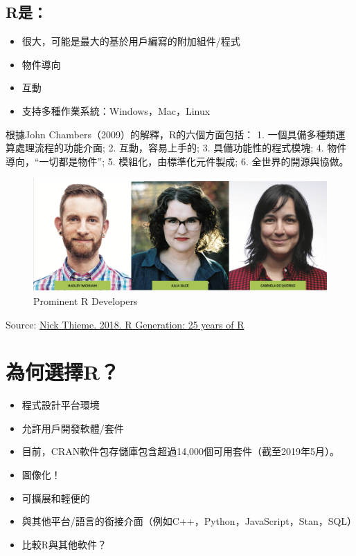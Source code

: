 \documentclass[]{book}
\providecommand{\tightlist}{%
  \setlength{\itemsep}{0pt}\setlength{\parskip}{0pt}}
\begin{document}
\hypertarget{r-2}{%
\subsection{R是：}\label{r-2}}

\begin{itemize}
\tightlist
\item
  很大，可能是最大的基於用戶編寫的附加組件/程式
\item
  物件導向
\item
  互動
\item
  支持多種作業系統：Windows，Mac，Linux
\end{itemize}

根據John Chambers（2009）的解釋，R的六個方面包括：
1. 一個具備多種類運算處理流程的功能介面;
2. 互動，容易上手的;
3. 具備功能性的程式模塊;
4. 物件導向，``一切都是物件'';
5. 模組化，由標準化元件製成;
6. 全世界的開源與協做。

\begin{figure}
\includegraphics[width=1\linewidth]{Rdevelopers} \caption{Prominent R Developers}\label{fig:Rdevelopers}
\end{figure}

Source: \href{https://rss.onlinelibrary.wiley.com/doi/10.1111/j.1740-9713.2018.01169.x}{Nick Thieme. 2018. R Generation: 25 years of R}

\hypertarget{r-3}{%
\section{為何選擇R？}\label{r-3}}

\begin{itemize}
\tightlist
\item
  程式設計平台環境
\item
  允許用戶開發軟體/套件
\item
  目前，CRAN軟件包存儲庫包含超過14,000個可用套件（截至2019年5月）。
\item
  圖像化！
\item
  可擴展和輕便的
\item
  與其他平台/語言的銜接介面（例如C++，Python，JavaScript，Stan，SQL）
\item
  比較R與其他軟件？
\end{itemize}
\end{document}

